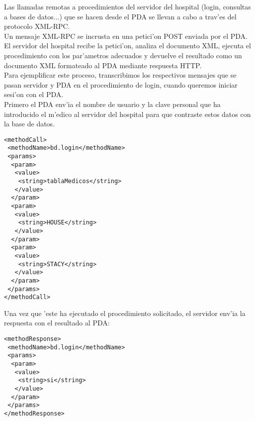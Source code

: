 Las llamadas remotas a procedimientos del servidor del hospital (login, consultas a bases de datos...) que se hacen desde el PDA se llevan a cabo a trav'es del protocolo XML-RPC. \bigskip \\  Un mensaje XML-RPC se incrusta en una petici'on POST enviada por el PDA. El servidor del hospital recibe la petici'on, analiza el documento XML, ejecuta el procedimiento con los par'ametros adecuados y devuelve el resultado como un documento XML formateado al PDA mediante respuesta HTTP.\bigskip \\ Para ejemplificar este proceso, transcribimos los respectivos mensajes que se pasan servidor y PDA en el procedimiento de login, cuando queremos iniciar sesi'on con el PDA. \bigskip \\ Primero el PDA env'ia el nombre de usuario y la clave personal que ha introducido el m'edico al servidor del hospital para que contraste estos datos con la base de datos.

\begin{verbatim}
<methodCall>
 <methodName>bd.login</methodName>
 <params>
  <param>
   <value>
    <string>tablaMedicos</string>
   </value>
  </param>
  <param>
   <value>
    <string>HOUSE</string>
   </value>
  </param>
  <param>
   <value>
    <string>STACY</string>
   </value>
  </param>
 </params>
</methodCall>
\end{verbatim}

Una  vez que 'este ha ejecutado el procedimiento solicitado, el servidor env'ia la respuesta con el resultado al PDA:

\begin{verbatim}
<methodResponse>
 <methodName>bd.login</methodName>
 <params>
  <param>
   <value>
    <string>si</string>
   </value>
  </param>
 </params>
</methodResponse>
\end{verbatim}